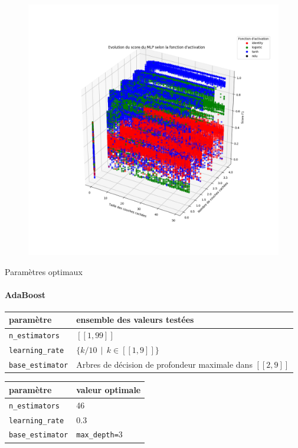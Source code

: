 \documentclass{beamer}
\begin{document}
\begin{frame}
\begin{figure}
\centering
\includegraphics[width=.7\textwidth]{img/mlp_activation.png}
\end{figure}
\end{frame}

\begin{frame}{Paramètres optimaux}
\framesubtitle{AdaBoost}
\begin{table}
\tiny
\centering
\begin{tabular}{l l}
paramètre & ensemble des valeurs testées \\
\hline
\texttt{n\_estimators} & $[\![1, 99]\!]$ \\
\texttt{learning\_rate} & $\{k/10 \>\> | \>\> k \in [\![1, 9]\!] \}$ \\
\texttt{base\_estimator} & Arbres de décision de profondeur maximale dans $[\![2, 9]\!]$ \\
\end{tabular}
\end{table}

\begin{table}
\centering
\begin{tabular}{l l}
paramètre & valeur optimale \\
\hline
\texttt{n\_estimators} & 46\\
\texttt{learning\_rate} & 0.3 \\
\texttt{base\_estimator} & \texttt{max\_depth=}3\\
\end{tabular}
\end{table}

\end{frame}
\end{document}
